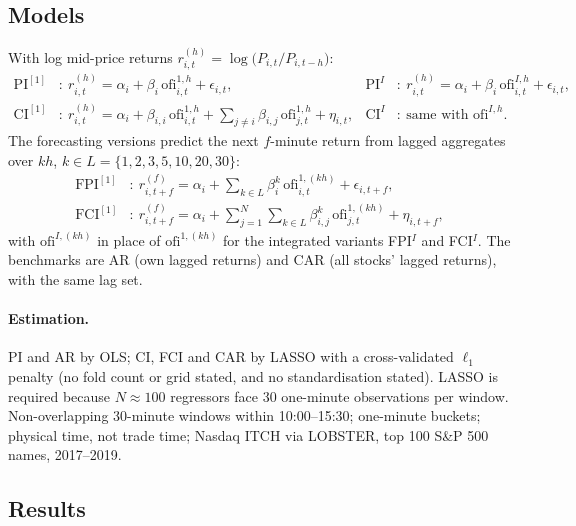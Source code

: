 \documentclass[11pt]{article}
\begin{document}
\subsection{Models}

With log mid-price returns $r^{(h)}_{i,t}=\log\bigl(P_{i,t}/P_{i,t-h}\bigr)$:
\begin{align}
\text{PI}^{[1]}&:\ r^{(h)}_{i,t}=\alpha_i+\beta_i\,\mathrm{ofi}^{1,h}_{i,t}+\epsilon_{i,t},
&\text{PI}^{I}&:\ r^{(h)}_{i,t}=\alpha_i+\beta_i\,\mathrm{ofi}^{I,h}_{i,t}+\epsilon_{i,t},\\
\text{CI}^{[1]}&:\ r^{(h)}_{i,t}=\alpha_i+\beta_{i,i}\,\mathrm{ofi}^{1,h}_{i,t}
+\sum_{j\neq i}\beta_{i,j}\,\mathrm{ofi}^{1,h}_{j,t}+\eta_{i,t},
&\text{CI}^{I}&:\ \text{same with } \mathrm{ofi}^{I,h}.
\end{align}
The forecasting versions predict the next $f$-minute return from lagged
aggregates over $kh$, $k\in L=\{1,2,3,5,10,20,30\}$:
\begin{align}
\text{FPI}^{[1]}&:\ r^{(f)}_{i,t+f}=\alpha_i+\sum_{k\in L}\beta^{k}_i\,\mathrm{ofi}^{1,(kh)}_{i,t}+\epsilon_{i,t+f},\\
\text{FCI}^{[1]}&:\ r^{(f)}_{i,t+f}=\alpha_i+\sum_{j=1}^{N}\sum_{k\in L}\beta^{k}_{i,j}\,\mathrm{ofi}^{1,(kh)}_{j,t}+\eta_{i,t+f},
\end{align}
with $\mathrm{ofi}^{I,(kh)}$ in place of $\mathrm{ofi}^{1,(kh)}$ for the
integrated variants FPI$^{I}$ and FCI$^{I}$. The benchmarks are AR (own lagged
returns) and CAR (all stocks' lagged returns), with the same lag set.

\paragraph{Estimation.} PI and AR by OLS; CI, FCI and CAR by LASSO with a
cross-validated $\ell_1$ penalty (no fold count or grid stated, and no
standardisation stated). LASSO is required because $N\approx100$ regressors
face 30 one-minute observations per window. Non-overlapping 30-minute windows
within 10:00--15:30; one-minute buckets; physical time, not trade time; Nasdaq
ITCH via LOBSTER, top 100 S\&P 500 names, 2017--2019.

\subsection{Results}
\end{document}

